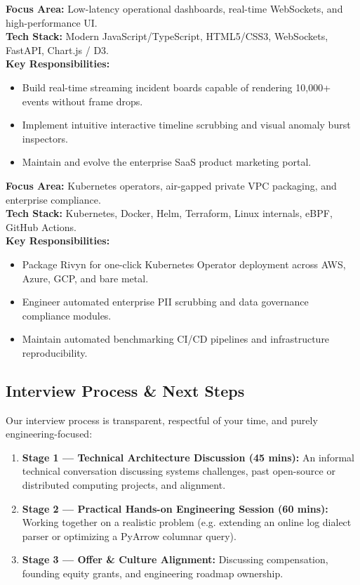 \documentclass[11pt,a4paper]{article}
\begin{document}
\begin{featurebox}
\textbf{Focus Area:} Low-latency operational dashboards, real-time WebSockets, and high-performance UI.\\
\textbf{Tech Stack:} Modern JavaScript/TypeScript, HTML5/CSS3, WebSockets, FastAPI, Chart.js / D3.\\
\textbf{Key Responsibilities:}
\begin{itemize}[leftmargin=*]
    \item Build real-time streaming incident boards capable of rendering 10,000+ events without frame drops.
    \item Implement intuitive interactive timeline scrubbing and visual anomaly burst inspectors.
    \item Maintain and evolve the enterprise SaaS product marketing portal.
\end{itemize}
\end{featurebox}

\begin{featurebox}
\textbf{Focus Area:} Kubernetes operators, air-gapped private VPC packaging, and enterprise compliance.\\
\textbf{Tech Stack:} Kubernetes, Docker, Helm, Terraform, Linux internals, eBPF, GitHub Actions.\\
\textbf{Key Responsibilities:}
\begin{itemize}[leftmargin=*]
    \item Package Rivyn for one-click Kubernetes Operator deployment across AWS, Azure, GCP, and bare metal.
    \item Engineer automated enterprise PII scrubbing and data governance compliance modules.
    \item Maintain automated benchmarking CI/CD pipelines and infrastructure reproducibility.
\end{itemize}
\end{featurebox}

\subsection{Interview Process \& Next Steps}
Our interview process is transparent, respectful of your time, and purely engineering-focused:
\begin{enumerate}[leftmargin=*]
    \item \textbf{Stage 1 --- Technical Architecture Discussion (45 mins):} An informal technical conversation discussing systems challenges, past open-source or distributed computing projects, and alignment.
    \item \textbf{Stage 2 --- Practical Hands-on Engineering Session (60 mins):} Working together on a realistic problem (e.g. extending an online log dialect parser or optimizing a PyArrow columnar query).
    \item \textbf{Stage 3 --- Offer \& Culture Alignment:} Discussing compensation, founding equity grants, and engineering roadmap ownership.
\end{enumerate}
\end{document}
